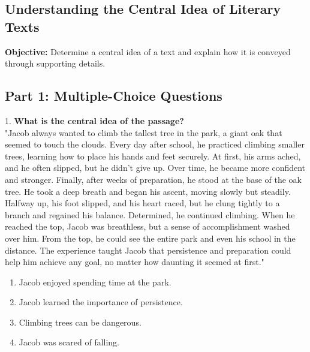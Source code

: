 \documentclass[12pt]{article}
\begin{document}
\subsection*{Understanding the Central Idea of Literary Texts}
\onehalfspacing

\begin{tcolorbox}[colframe=black!40, colback=gray!0, title=Learning Objective]
\textbf{Objective:} Determine a central idea of a text and explain how it is conveyed through supporting details.
\end{tcolorbox}

\subsection*{Part 1: Multiple-Choice Questions}

1. \textbf{What is the central idea of the passage?\\}
"Jacob always wanted to climb the tallest tree in the park, a giant oak that seemed to touch the clouds. Every day after school, he practiced climbing smaller trees, learning how to place his hands and feet securely. At first, his arms ached, and he often slipped, but he didn’t give up. Over time, he became more confident and stronger. Finally, after weeks of preparation, he stood at the base of the oak tree. He took a deep breath and began his ascent, moving slowly but steadily. Halfway up, his foot slipped, and his heart raced, but he clung tightly to a branch and regained his balance. Determined, he continued climbing. When he reached the top, Jacob was breathless, but a sense of accomplishment washed over him. From the top, he could see the entire park and even his school in the distance. The experience taught Jacob that persistence and preparation could help him achieve any goal, no matter how daunting it seemed at first."  
\begin{enumerate}[label=\Alph*.]
    \item Jacob enjoyed spending time at the park.  
    \item Jacob learned the importance of persistence.  
    \item Climbing trees can be dangerous.  
    \item Jacob was scared of falling.  
\end{enumerate}
\end{document}
